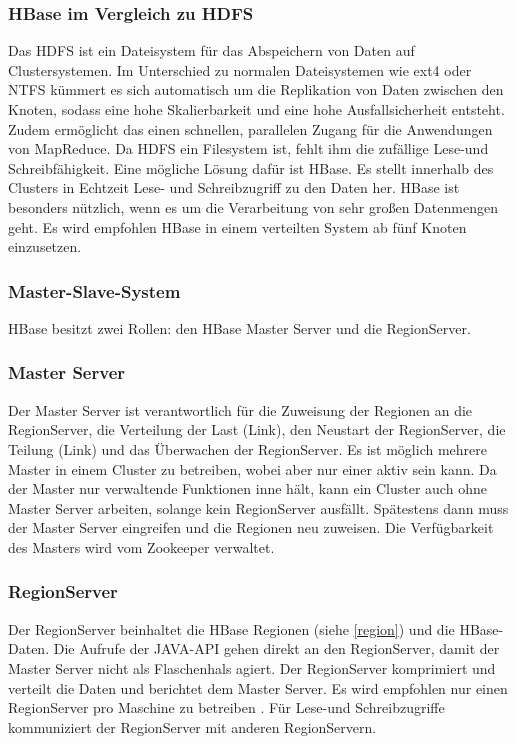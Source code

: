 \subsubsection{HBase im Vergleich zu HDFS}
Das \ac{HDFS} ist ein Dateisystem für das Abspeichern von Daten auf Clustersystemen. Im Unterschied zu normalen Dateisystemen wie ext4 oder NTFS kümmert es sich automatisch um die Replikation von Daten zwischen den Knoten,  
sodass eine hohe Skalierbarkeit und eine hohe Ausfallsicherheit entsteht. Zudem ermöglicht das einen schnellen, parallelen Zugang für die Anwendungen von MapReduce. Da HDFS ein Filesystem ist, fehlt ihm die zufällige Lese-und Schreibfähigkeit. Eine mögliche Lösung dafür ist HBase. Es stellt innerhalb des Clusters in Echtzeit Lese- und Schreibzugriff zu den Daten her. HBase ist besonders nützlich, wenn es um die Verarbeitung von sehr großen Datenmengen geht. Es wird empfohlen HBase in einem verteilten System ab fünf Knoten einzusetzen.


\subsubsection{Master-Slave-System}
HBase besitzt zwei Rollen: den HBase Master Server und die RegionServer.

\subsubsection{Master Server}
Der Master Server ist verantwortlich für die Zuweisung der Regionen an die RegionServer, die Verteilung der Last (Link), den Neustart der RegionServer, die Teilung (Link) und das Überwachen der RegionServer. Es ist möglich mehrere Master in einem Cluster zu betreiben, wobei aber nur einer aktiv sein kann. Da der Master nur verwaltende Funktionen inne hält, kann ein Cluster auch ohne Master Server arbeiten, solange kein RegionServer ausfällt. Spätestens dann muss der Master Server eingreifen und die Regionen neu zuweisen. Die Verfügbarkeit des Masters wird vom Zookeeper verwaltet.

\subsubsection{RegionServer}
Der RegionServer beinhaltet die HBase Regionen (siehe \ref{region}) und die HBase-Daten. Die Aufrufe der JAVA-API gehen direkt an den RegionServer, damit der Master Server nicht als Flaschenhals agiert. Der RegionServer komprimiert und verteilt die Daten und berichtet dem Master Server. Es wird empfohlen nur einen RegionServer pro Maschine zu betreiben \cite{Redt01}. Für Lese-und Schreibzugriffe kommuniziert der RegionServer mit anderen RegionServern.

